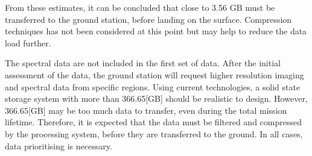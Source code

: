 \begin{table}[htb!]
  \centering
\caption{The total storage required from the storage system.}
  \label{tab:data_rate_storage_requirements_final_5}%
\end{table}%

From these estimates, it can be concluded that close to 3.56 GB must be transferred to the ground station, before landing on the surface. Compression techniques has not been considered at this point but may help to reduce the data load further. 

The spectral data are not included in the first set of data. After the initial assessment of the data, the ground station will request higher resolution imaging and spectral data from specific regions. Using current technologies, a solid state storage system with more than 366.65[GB] should be realistic to design. However, 366.65[GB] may be too much data to transfer, even during the total mission lifetime. Therefore, it is expected that the data must be filtered and compressed by the processing system, before they are transferred to the ground. In all cases, data prioritising is necessary.
